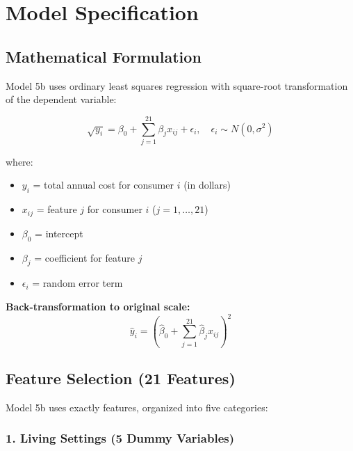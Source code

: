 \section{Model Specification}

\subsection{Mathematical Formulation}

Model 5b uses ordinary least squares regression with square-root transformation of the dependent variable:

\begin{equation}\label{eq:model5b}
\sqrt{y_i} = \beta_0 + \sum_{j=1}^{21} \beta_j x_{ij} + \epsilon_i, \quad \epsilon_i \sim N(0, \sigma^2)
\end{equation}

where:
\begin{itemize}
    \item $y_i$ = total annual cost for consumer $i$ (in dollars)
    \item $x_{ij}$ = feature $j$ for consumer $i$ ($j = 1, \ldots, 21$)
    \item $\beta_0$ = intercept
    \item $\beta_j$ = coefficient for feature $j$
    \item $\epsilon_i$ = random error term
\end{itemize}

\textbf{Back-transformation to original scale:}
\begin{equation}
\hat{y}_i = \left(\hat{\beta}_0 + \sum_{j=1}^{21} \hat{\beta}_j x_{ij}\right)^2
\end{equation}

\subsection{Feature Selection (21 Features)}

Model 5b uses exactly \ModelOneNumFeatures{} features, organized into five categories:

\subsubsection{1. Living Settings (5 Dummy Variables)}


